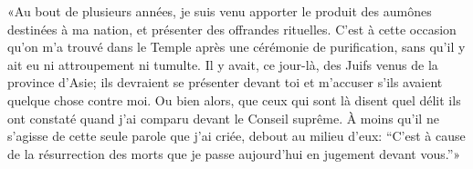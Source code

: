 «Au bout de plusieurs années,
	je suis venu apporter le produit des aumônes destinées à ma nation,
	et présenter des offrandes rituelles.
C’est à cette occasion qu’on m’a trouvé dans le Temple
	après une cérémonie de purification,
	sans qu’il y ait eu ni attroupement ni tumulte.
Il y avait, ce jour-là, des Juifs venus de la province d’Asie;
	ils devraient se présenter devant toi et m’accuser
	s’ils avaient quelque chose contre moi.
Ou bien alors, que ceux qui sont là disent quel délit ils ont constaté
	quand j’ai comparu devant le Conseil suprême.
À moins qu’il ne s’agisse de cette seule parole que j’ai criée,
	debout au milieu d’eux:
	“C’est à cause de la résurrection des morts
	que je passe aujourd’hui en jugement devant vous.”»
